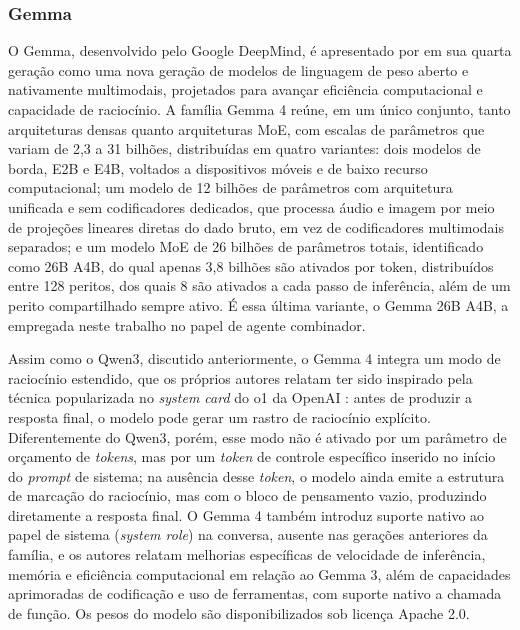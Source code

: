 \subsubsection{Gemma}

O Gemma, desenvolvido pelo Google DeepMind, é apresentado por \citet{gemma4team2026} em sua quarta geração como uma nova geração de modelos de linguagem de peso aberto e nativamente multimodais, projetados para avançar eficiência computacional e capacidade de raciocínio. A família Gemma 4 reúne, em um único conjunto, tanto arquiteturas densas quanto arquiteturas MoE, com escalas de parâmetros que variam de 2,3 a 31 bilhões, distribuídas em quatro variantes: dois modelos de borda, E2B e E4B, voltados a dispositivos móveis e de baixo recurso computacional; um modelo de 12 bilhões de parâmetros com arquitetura unificada e sem codificadores dedicados, que processa áudio e imagem por meio de projeções lineares diretas do dado bruto, em vez de codificadores multimodais separados; e um modelo MoE de 26 bilhões de parâmetros totais, identificado como 26B A4B, do qual apenas 3,8 bilhões são ativados por token, distribuídos entre 128 peritos, dos quais 8 são ativados a cada passo de inferência, além de um perito compartilhado sempre ativo. É essa última variante, o Gemma 26B A4B, a empregada neste trabalho no papel de agente combinador.

Assim como o Qwen3, discutido anteriormente, o Gemma 4 integra um modo de raciocínio estendido, que os próprios autores relatam ter sido inspirado pela técnica popularizada no \textit{system card} do o1 da OpenAI \citep{o1systemcard2024}: antes de produzir a resposta final, o modelo pode gerar um rastro de raciocínio explícito. Diferentemente do Qwen3, porém, esse modo não é ativado por um parâmetro de orçamento de \textit{tokens}, mas por um \textit{token} de controle específico inserido no início do \textit{prompt} de sistema; na ausência desse \textit{token}, o modelo ainda emite a estrutura de marcação do raciocínio, mas com o bloco de pensamento vazio, produzindo diretamente a resposta final. O Gemma 4 também introduz suporte nativo ao papel de sistema (\textit{system role}) na conversa, ausente nas gerações anteriores da família, e os autores relatam melhorias específicas de velocidade de inferência, memória e eficiência computacional em relação ao Gemma 3, além de capacidades aprimoradas de codificação e uso de ferramentas, com suporte nativo a chamada de função. Os pesos do modelo são disponibilizados sob licença Apache 2.0.


